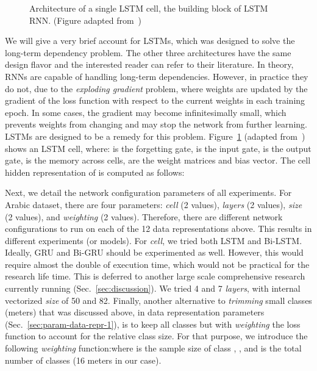 \documentclass[journal,10pt,twocolumns,letter]{IEEEtran}
\begin{document}
\begin{figure}[!tb]


   \caption{Architecture of a single LSTM cell, the building block of LSTM RNN\@. (Figure adapted
    from~\cite{Colah2015UnderstandingLstmNetworks})}\label{lstm}
\end{figure}

We will give a very brief account for LSTMs, which was designed to solve the long-term dependency
problem. The other three architectures have the same design flavor and the interested reader can
refer to their literature. In theory, RNNs are capable of handling long-term dependencies. However,
in practice they do not, due to the \textit{exploding gradient} problem, where weights are updated
by the gradient of the loss function with respect to the current weights in each training epoch. In
some cases, the gradient may become infinitesimally small, which prevents weights from changing and
may stop the network from further learning. LSTMs are designed to be a remedy for this
problem. Figure~\ref{lstm} (adapted from~\cite{Colah2015UnderstandingLstmNetworks}) shows an LSTM
cell, where:  is the forgetting gate,  is the input gate,  is the output gate, 
is the memory across cells,  are the weight matrices
and bias vector. The cell hidden representation  of  is computed as follows:

Next, we detail the network configuration parameters of all experiments. For Arabic dataset, there
are four parameters: \textit{cell} (2 values), \textit{layers} (2 values), \textit{size} (2
values), and \textit{weighting} (2 values). Therefore, there are  different network
configurations to run on each of the 12 data representations above. This results in
 different experiments (or models). For \textit{cell}, we tried both LSTM and
Bi-LSTM\@. Ideally, GRU and Bi-GRU should be experimented as well. However, this would require
almost the double of execution time, which would not be practical for the research life time. This
is deferred to another large scale comprehensive research currently running
(Sec.~\ref{sec:discussion}). We tried 4 and 7 \textit{layers}, with internal vectorized
\textit{size} of 50 and 82. Finally, another alternative to \textit{trimming} small classes (meters)
that was discussed above, in data representation parameters (Sec.~\ref{sec:param-data-repr-1}), is
to keep all classes but with \textit{weighting} the loss function to account for the relative class
size. For that purpose, we introduce the following \textit{weighting} function:where  is the sample size of class , , and  is the total number of
classes (16 meters in our case).
\end{document}
